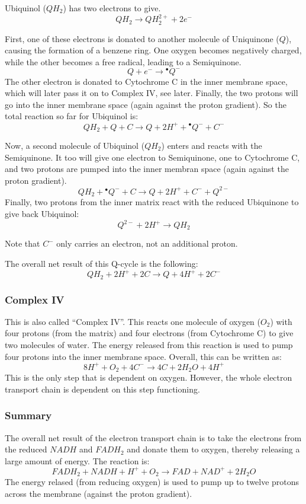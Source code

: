 \documentclass{article}
\begin{document}
Ubiquinol ($QH_2$) has two electrons to give.
\[
    QH_2 \rightarrow QH_2^{2+} + 2e^-
\]

First, one of these electrons is donated to another molecule of Uniquinone ($Q$), causing the
formation of a benzene ring.  One oxygen becomes negatively charged, while the other
becomes a free radical, leading to a Semiquinone.
\[
    Q + e^- \rightarrow {}^{\bullet}Q^{-}
\]
The other electron is donated to Cytochrome C in the inner membrane space, which will later
pass it on to Complex IV, see later. Finally, the two protons will go into the inner
membrane space (again against the proton gradient). So the total reaction so far for
Ubiquinol is:
\[
    QH_2 + Q + C \rightarrow Q + 2H^+ + {}^{\bullet}Q^{-} + C^-
\]

Now, a second molecule of Ubiquinol ($QH_2$) enters and reacts with the Semiquinone.
It too will give one electron to Semiquinone, one to Cytochrome C, and two protons
are pumped into the inner membran space (again against the proton gradient).
\[
    QH_2 + {}^{\bullet}Q^{-} + C \rightarrow Q + 2H^+ + C^- + Q^{2-}
\]
Finally, two protons from the inner matrix react with the reduced Ubiquinone to give back
Ubiquinol:
\[
    Q^{2-} + 2H^+ \rightarrow QH_2
\]

Note that $C^-$ only carries an electron, not an additional proton.

The overall net result of this Q-cycle is the following:
\[
    QH_2 + 2H^+ + 2C \rightarrow Q + 4H^+ + 2C^-
\]

\subsubsection{Complex IV}
This is also called ``Complex IV''.
This reacts one molecule of oxygen ($O_2$) with four protons (from the matrix) and four
electrons (from Cytochrome C) to give two molecules of water. The energy released
from this reaction is used to pump four protons into the inner membrane space.
Overall, this can be written as:
\[
    8H^+ + O_2 + 4C^- \rightarrow 4C + 2H_2O + 4H^+
\]
This is the only step that is dependent on oxygen. However, the whole electron transport
chain is dependent on this step functioning.

\subsubsection{Summary}
The overall net result of the electron transport chain is to take the electrons from the
reduced $NADH$ and $FADH_2$ and donate them to oxygen, thereby releasing a large amount of
energy. The reaction is:
\[
    FADH_2 + NADH + H^+ + O_2 \rightarrow FAD + NAD^+ + 2H_2O
\]
The energy relased (from reducing oxygen) is used to pump up to twelve protons across the
membrane (against the proton gradient).
\end{document}
